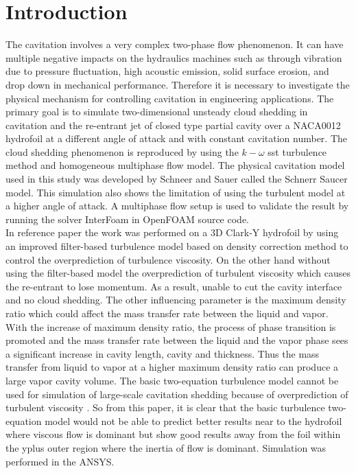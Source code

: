 \chapter*{Introduction}
\label{chap:introduction}
\renewcommand{\thepage}{\arabic{page}}
The cavitation involves a very complex two-phase flow phenomenon. It
can have multiple negative impacts on the hydraulics machines such as
through vibration due to pressure fluctuation, high acoustic emission,
solid surface erosion, and drop down in mechanical
performance. Therefore it is necessary to investigate the physical
mechanism for controlling cavitation in engineering applications. The
primary goal is to simulate two-dimensional unsteady cloud shedding in
cavitation and the re-entrant jet of closed type partial cavity over a
NACA0012 hydrofoil at a different angle of attack and with constant
cavitation number. The cloud shedding phenomenon is reproduced by
using the $k- {\omega}$ sst turbulence method and homogeneous
multiphase flow model. The physical cavitation model used in this
study was developed by Schneer and Sauer called the Schnerr Saucer
model. This simulation also shows the limitation of using the
turbulent model at a higher angle of attack. A multiphase flow setup
is used to validate the result by running the solver InterFoam in
OpenFOAM source code.\\ In reference paper \cite{ZHANG2017} the work
was performed on a 3D Clark-Y hydrofoil by using an improved
filter-based turbulence model based on density correction method to
control the overprediction of turbulence viscosity. On the other hand
without using the filter-based model the overprediction of turbulent
viscosity which causes the re-entrant to lose momentum. As a result,
unable to cut the cavity interface and no cloud shedding. The other
influencing parameter is the maximum density ratio which could affect
the mass transfer rate between the liquid and vapor. With the increase
of maximum density ratio, the process of phase transition is promoted
and the mass transfer rate between the liquid and the vapor phase sees
a significant increase in cavity length, cavity and thickness. Thus
the mass transfer from liquid to vapor at a higher maximum density
ratio can produce a large vapor cavity volume. The basic two-equation
turbulence model cannot be used for simulation of large-scale
cavitation shedding because of overprediction of turbulent viscosity
. So from this paper, it is clear that the basic turbulence
two-equation model would not be able to predict better results near to
the hydrofoil where viscous flow is dominant but show good results
away from the foil within the yplus outer region where the inertia of
flow is dominant. Simulation was performed in the ANSYS.

